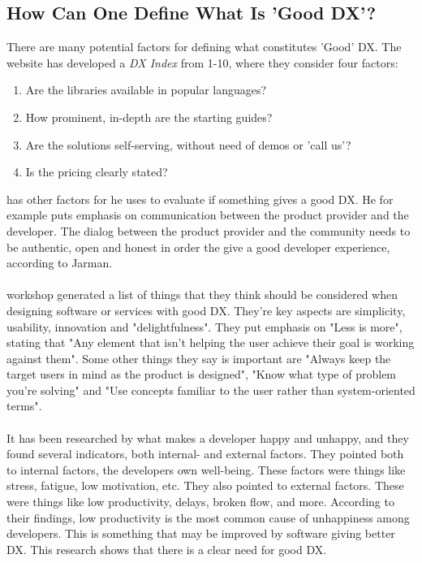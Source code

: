 \documentclass{article}
\begin{document}
\subsection{How Can One Define What Is 'Good DX'?}
There are many potential factors for defining what constitutes 'Good'
DX. The website \cite{everydeveloper} has developed a \textit{DX Index} from
1-10, where they consider four factors:

\begin{enumerate}
\item Are the libraries available in popular languages?
\item How prominent, in-depth are the starting guides?
\item Are the solutions self-serving, without need of demos or 'call us'?
\item Is the pricing clearly stated?
\end{enumerate}
\cite{jarman} has other factors for he uses to evaluate
if something gives a good DX. He for example puts emphasis on
communication between the product provider and the developer. The dialog
between the product provider and the community needs to be authentic,
open and honest in order the give a good developer experience, according
to Jarman.
\\ \\
\cite{dhide} workshop generated a list of things that they think should be considered when designing software or services with good DX. They're key aspects are simplicity, usability, innovation and "delightfulness". They put emphasis on "Less is more", stating that "Any element that isn't helping the user achieve their goal is working against them". Some other things they say is important are "Always keep the target users in mind as the product is designed", "Know what type of problem you’re solving" and "Use concepts familiar to the user rather than system-oriented terms".
\\ \\
It has been researched by \cite{unhappy} what makes a developer
happy and unhappy, and they found several indicators, both
internal- and external factors. They pointed both to internal factors, the developers own well-being. These factors were things like stress, fatigue, low motivation, etc. They also pointed to external factors. These were things like low productivity, delays, broken flow, and more. According to their findings, low productivity is the most common cause of unhappiness among developers. This is something that may be improved by software giving better DX. This research shows that there is a clear need for good DX.
\end{document}
